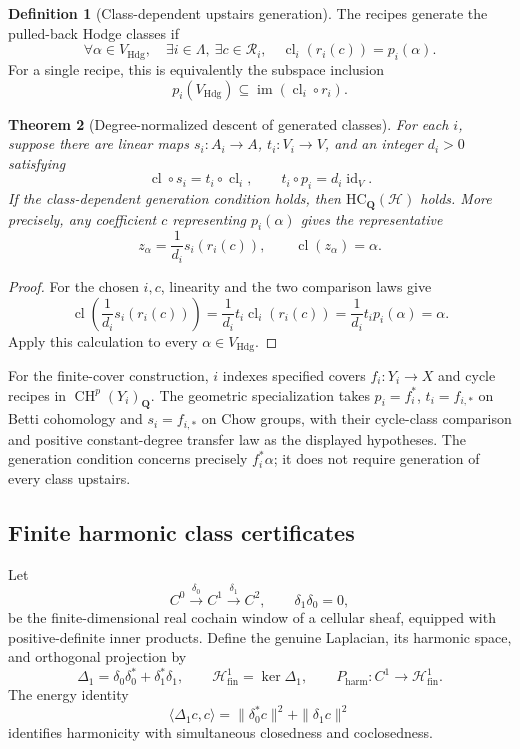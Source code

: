 \documentclass[11pt]{article}
\newtheorem{theorem}{Theorem}[section]
\theoremstyle{definition}
\newtheorem{definition}[theorem]{Definition}
\theoremstyle{remark}
\DeclareMathOperator{\CH}{CH}
\newcommand{\Q}{\mathbf Q}
\begin{document}
\begin{definition}[Class-dependent upstairs generation]
\label{def:upstairs-generation}
The recipes generate the pulled-back Hodge classes if
\[
 \forall\alpha\in V_{\mathrm{Hdg}},\quad
 \exists i\in\Lambda,\ \exists c\in\mathcal R_i,\quad
 \operatorname{cl}_i(r_i(c))=p_i(\alpha).
\]
For a single recipe, this is equivalently the subspace inclusion
\[
 p_i(V_{\mathrm{Hdg}})
   \subseteq\operatorname{im}(\operatorname{cl}_i\circ r_i).
\]
\end{definition}

\begin{theorem}[Degree-normalized descent of generated classes]
\label{thm:upstairs-generation-descent}
For each \(i\), suppose there are linear maps
\(s_i:A_i\to A\), \(t_i:V_i\to V\), and an integer \(d_i>0\) satisfying
\[
 \operatorname{cl}\circ s_i=t_i\circ\operatorname{cl}_i,
 \qquad t_i\circ p_i=d_i\operatorname{id}_V.
\]
If the class-dependent generation condition holds, then
\(\mathrm{HC}_{\Q}(\mathscr H)\) holds. More precisely, any coefficient
\(c\) representing \(p_i(\alpha)\) gives the representative
\[
 z_\alpha=\frac{1}{d_i}s_i(r_i(c)),
 \qquad \operatorname{cl}(z_\alpha)=\alpha.
\]
\end{theorem}

\begin{proof}
For the chosen \(i,c\), linearity and the two comparison laws give
\[
 \operatorname{cl}\left(\frac{1}{d_i}s_i(r_i(c))\right)
 =\frac{1}{d_i}t_i\operatorname{cl}_i(r_i(c))
 =\frac{1}{d_i}t_i p_i(\alpha)=\alpha.
\]
Apply this calculation to every \(\alpha\in V_{\mathrm{Hdg}}\).
\end{proof}

For the finite-cover construction, \(i\) indexes specified covers
\(f_i:Y_i\to X\) and cycle recipes in \(\CH^p(Y_i)_{\Q}\).
The geometric specialization takes \(p_i=f_i^*\), \(t_i=f_{i,*}\)
on Betti cohomology and \(s_i=f_{i,*}\) on Chow groups, with their
cycle-class comparison and positive constant-degree transfer law as the
displayed hypotheses. The generation condition concerns precisely
\(f_i^*\alpha\); it does not require generation of every class upstairs.

\subsection{Finite harmonic class certificates}
\label{subsec:finite-harmonic-certificates}

Let
\[
 C^0\xrightarrow{\delta_0}C^1\xrightarrow{\delta_1}C^2,
 \qquad \delta_1\delta_0=0,
\]
be the finite-dimensional real cochain window of a cellular sheaf, equipped
with positive-definite inner products. Define the genuine Laplacian,
its harmonic space, and orthogonal projection by
\[
 \Delta_1=\delta_0\delta_0^*+\delta_1^*\delta_1,\qquad
 \mathcal H^1_{\mathrm{fin}}=\ker\Delta_1,\qquad
 P_{\mathrm{harm}}:C^1\longrightarrow\mathcal H^1_{\mathrm{fin}}.
\]
The energy identity
\[
 \langle\Delta_1c,c\rangle
   =\|\delta_0^*c\|^2+\|\delta_1c\|^2
\]
identifies harmonicity with simultaneous closedness and coclosedness.
\end{document}
